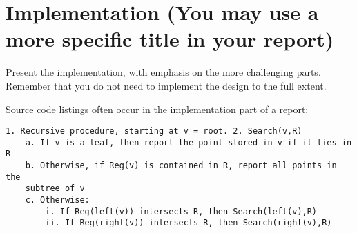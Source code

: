 \cleardoublepage
\chapter{Implementation (You may use a more specific title in your report)}
\label{implement} Present the implementation, with emphasis on the
more challenging parts. Remember that you do not need to implement
the design to the full extent.

Source code listings often occur in the implementation part of a
report:

\begin{lstlisting}[frame=trbl]
1. Recursive procedure, starting at v = root. 2. Search(v,R)
    a. If v is a leaf, then report the point stored in v if it lies in R
    b. Otherwise, if Reg(v) is contained in R, report all points in the
    subtree of v
    c. Otherwise:
        i. If Reg(left(v)) intersects R, then Search(left(v),R)
        ii. If Reg(right(v)) intersects R, then Search(right(v),R)
\end{lstlisting}

